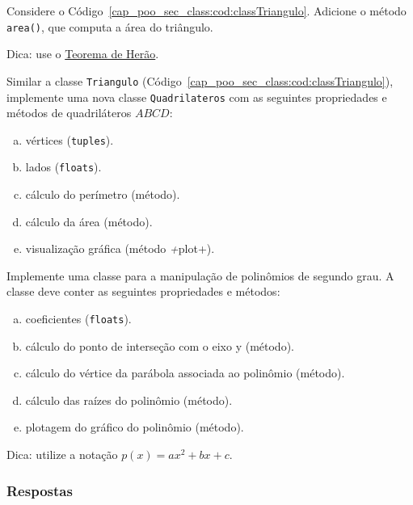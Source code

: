 \begin{exer}
  Considere o Código~\ref{cap_poo_sec_class:cod:classTriangulo}. Adicione o método \lstinline+area()+, que computa a área do triângulo.
\end{exer}
\begin{resp}
  Dica: use o \href{https://pt.wikipedia.org/wiki/Teorema_de_Her%C3%A3o}{Teorema de Herão}.
\end{resp}

\begin{exer}
  Similar a classe \lstinline+Triangulo+ (Código~\ref{cap_poo_sec_class:cod:classTriangulo}), implemente uma nova classe \lstinline+Quadrilateros+ com as seguintes propriedades e métodos de quadriláteros $ABCD$:
  \begin{enumerate}[a)]
  \item vértices (\lstinline+tuples+).
  \item lados (\lstinline+floats+).
  \item cálculo do perímetro (método).
  \item cálculo da área (método).
  \item visualização gráfica (método \textit+plot+).
  \end{enumerate}
\end{exer}

\begin{exer}
  Implemente uma classe para a manipulação de polinômios de segundo grau. A classe deve conter as seguintes propriedades e métodos:
  \begin{enumerate}[a)]
  \item coeficientes (\lstinline+floats+).
  \item cálculo do ponto de interseção com o eixo y (método).
  \item cálculo do vértice da parábola associada ao polinômio (método).
  \item cálculo das raízes do polinômio (método).
  \item plotagem do gráfico do polinômio (método).
  \end{enumerate}
\end{exer}
\begin{resp}
  Dica: utilize a notação $p(x) = ax^2 + bx + c$.
\end{resp}

\ifisbook
\subsubsection{Respostas}
\shipoutAnswer
\fi

